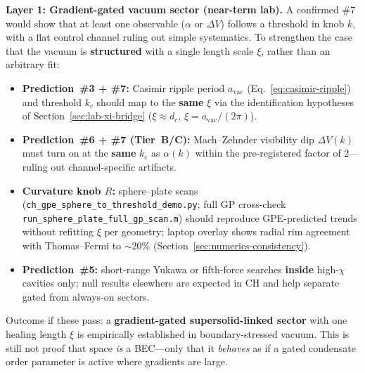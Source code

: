 \documentclass[11pt,a4paper]{article}
\begin{document}
\textbf{Layer 1: Gradient-gated vacuum sector (near-term lab).}
A confirmed \#7 would show that at least one observable ($\alpha$ or $\Delta V$) follows a threshold in knob $k$, with a flat control channel ruling out simple systematics.
To strengthen the case that the vacuum is \textbf{structured} with a single length scale $\xi$, rather than an arbitrary fit:
\begin{itemize}[leftmargin=*]
  \item \textbf{Prediction~\#3 + \#7:} Casimir ripple period $a_{\mathrm{vac}}$ (Eq.~\ref{eq:casimir-ripple}) and threshold $k_c$ should map to the \textbf{same} $\xi$ via the identification hypotheses of Section~\ref{sec:lab-xi-bridge} ($\xi \approx d_c$, $\xi = a_{\mathrm{vac}}/(2\pi)$).
  \item \textbf{Prediction~\#6 + \#7 (Tier~B/C):} Mach--Zehnder visibility dip $\Delta V(k)$ must turn on at the \textbf{same} $k_c$ as $\alpha(k)$ within the pre-registered factor of 2---ruling out channel-specific artifacts.
  \item \textbf{Curvature knob $R$:} sphere--plate scans (\texttt{ch\_gpe\_sphere\_to\_threshold\_demo.py}; full GP cross-check \texttt{run\_sphere\_plate\_full\_gp\_scan.m}) should reproduce GPE-predicted trends without refitting $\xi$ per geometry; laptop overlay shows radial rim agreement with Thomas--Fermi to $\sim$20\% (Section~\ref{sec:numerics-consistency}).
  \item \textbf{Prediction~\#5:} short-range Yukawa or fifth-force searches \textbf{inside} high-$\chi$ cavities only; null results elsewhere are expected in CH and help separate gated from always-on sectors.
\end{itemize}
Outcome if these pass: a \textbf{gradient-gated supersolid-linked sector} with one healing length $\xi$ is empirically established in boundary-stressed vacuum.
This is still not proof that space \emph{is} a BEC---only that it \emph{behaves} as if a gated condensate order parameter is active where gradients are large.
\end{document}
